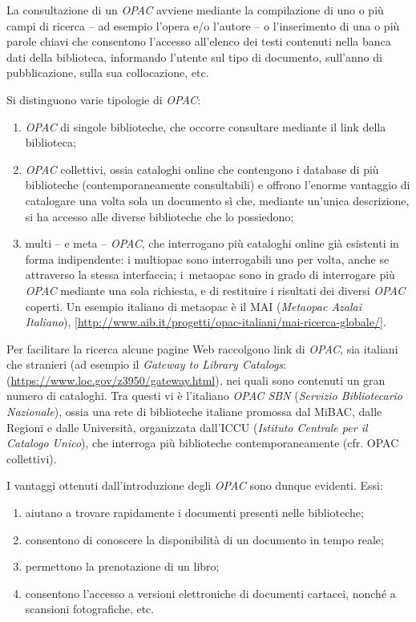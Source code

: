 \documentclass[
  b5paper,
  twoside,
  12pt,
  chapterprefix=false,
  bibliography=totocnumbered,
  parskip=false]{scrbook}
\begin{document}
La consultazione di un \emph{OPAC} avviene mediante la compilazione di uno o
più campi di ricerca -- ad esempio l'opera e/o l'autore -- o
l'inserimento di una o più parole chiavi che consentono l'accesso
all'elenco dei testi contenuti nella banca dati della biblioteca,
informando l'utente sul tipo di documento, sull'anno di pubblicazione,
sulla sua collocazione, etc.

Si distinguono varie tipologie di \emph{OPAC}:

\begin{enumerate}
\def\labelenumi{\arabic{enumi}.}
\item
  \emph{OPAC} di singole biblioteche, che occorre consultare mediante il
  link della biblioteca;
\item
  \emph{OPAC} collettivi, ossia cataloghi online che contengono i database
  di più biblioteche (contemporaneamente consultabili) e offrono
  l'enorme vantaggio di catalogare una volta sola un documento sì che,
  mediante un'unica descrizione, si ha accesso alle diverse
  biblioteche che lo possiedono;
\item
  multi -- e meta -- \emph{OPAC}, che interrogano più cataloghi online già
  esistenti in forma indipendente: i multiopac sono interrogabili uno
  per volta, anche se attraverso la stessa interfaccia; i~metaopac
  sono in grado di interrogare più \emph{OPAC} mediante una sola richiesta,
  e di restituire i risultati dei diversi \emph{OPAC} coperti. Un esempio
  italiano di metaopac è il MAI (\emph{Metaopac Azalai Italiano}),
  \href{http://www.aib.it/progetti/opac-italiani/mai-ricerca-globale/}{{[}http://www.aib.it/progetti/opac-italiani/mai-ricerca-globale/{]}}.
\end{enumerate}

Per facilitare la ricerca alcune pagine Web raccolgono link di \emph{OPAC},
sia italiani che stranieri (ad esempio il \emph{Gateway to Library Catalogs}:
(\url{https://www.loc.gov/z3950/gateway.html}),
nei quali sono contenuti un gran numero di cataloghi. Tra questi vi è
l'italiano \emph{OPAC SBN} (\emph{Servizio Bibliotecario Nazionale}), ossia una
rete di biblioteche italiane promossa dal MiBAC, dalle Regioni e dalle
Università, organizzata dall'ICCU (\emph{Istituto Centrale per il Catalogo
Unico}), che interroga più biblioteche contemporaneamente (cfr. OPAC
collettivi).

I vantaggi ottenuti dall'introduzione degli \emph{OPAC} sono dunque evidenti.
Essi:

\begin{enumerate}
\def\labelenumi{\arabic{enumi}.}
\item
  aiutano a trovare rapidamente i documenti presenti nelle
  biblioteche;
\item
  consentono di conoscere la disponibilità di un documento in tempo
  reale;
\item
  permettono la prenotazione di un libro;
\item
  consentono l'accesso a versioni elettroniche di documenti cartacei,
  nonché a scansioni fotografiche, etc.
\end{enumerate}
\end{document}
